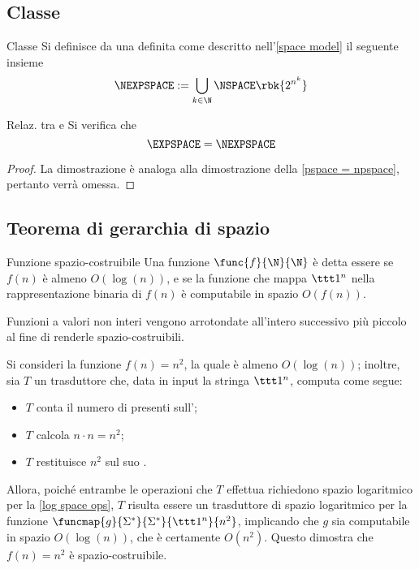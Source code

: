 \documentclass[a4paper, 12pt]{report}
\begin{document}
    \subsection{Classe \NEXPSPACE}

    \begin{frameddefn}{Classe \NEXPSPACE}
        Si definisce  da una \NTM definita come descritto nell'\cref{space model} il seguente insieme $$\NEXPSPACE := \bigcup_{k \in \N}{\NSPACE \rbk{2^{n^k}}}$$
    \end{frameddefn}

    \begin{framedprop}{Relaz. tra \EXPSPACE e \NEXPSPACE}
        Si verifica che $$\EXPSPACE = \NEXPSPACE$$
    \end{framedprop}

    \begin{proof}
        La dimostrazione è analoga alla dimostrazione della \cref{pspace = npspace}, pertanto verrà omessa.
    \end{proof}

    \subsection{Teorema di gerarchia di spazio}
    
    \begin{frameddefn}{Funzione spazio-costruibile}
        Una funzione $\func{f}{\N}{\N}$ è detta essere  se $f(n)$ è almeno $O(\log(n))$, e se la funzione che mappa $\ttt 1^n$ nella rappresentazione binaria di $f(n)$ è computabile in spazio $O(f(n))$.

        Funzioni a valori non interi vengono arrotondate all'intero successivo più piccolo al fine di renderle spazio-costruibili.
    \end{frameddefn}

    \begin{example}
        Si consideri la funzione $f(n) = n^2$, la quale è almeno $O(\log(n))$; inoltre, sia $T$ un trasduttore che, data in input la stringa $\ttt 1 ^n$, computa come segue:

        \begin{itemize}
            \item $T$ conta il numero di  presenti sull';
            \item $T$ calcola $n \cdot n = n^2$;
            \item $T$ restituisce $n^2$ sul suo .
        \end{itemize}

        Allora, poiché entrambe le operazioni che $T$ effettua richiedono spazio logaritmico per la \cref{log space ops}, $T$ risulta essere un trasduttore di spazio logaritmico per la funzione $\funcmap{g}{\Sigma^*}{\Sigma^*}{\ttt 1^n}{n^2}$, implicando che $g$ sia computabile in spazio $O(\log(n))$, che è certamente $O(n^2)$. Questo dimostra che $f(n) = n^2$ è spazio-costruibile.
    \end{example}
\end{document}
